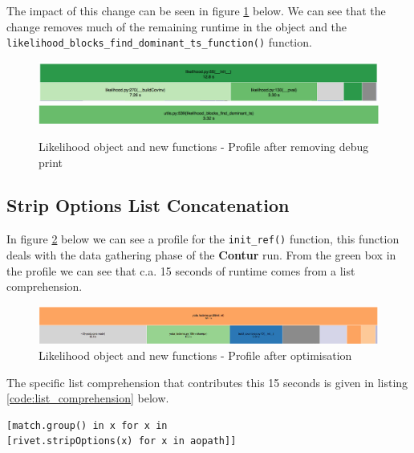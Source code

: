 The impact of this change can be seen in figure \ref{fig:like_last_profile_after_debugger} below. We can see that the change removes much of the remaining runtime in the  object and the \texttt{likelihood\_blocks\_find\_dominant\_ts\_function()} function.

\begin{figure}[H]
\centering
\includegraphics[scale=0.3]{plots/like_after_change.png}
\includegraphics[scale=0.3]{plots/like_blocks_find_dominant_ts.png}
\caption{Likelihood object and new functions - Profile after removing debug print}
\label{fig:like_last_profile_after_debugger}
\end{figure}


\subsection{Strip Options List Concatenation}
In figure \ref{fig:comprehension_before} below we can see a profile for the \texttt{init\_ref()} function, this function deals with the data gathering phase of the \textbf{Contur} run. From the green box in the profile we can see that c.a. 15 seconds of runtime comes from a list comprehension.

\begin{figure}[H]
\centering
\includegraphics[scale=0.3]{plots/list_comprehension_before.png}
\caption{Likelihood object and new functions - Profile after optimisation}
\label{fig:comprehension_before}
\end{figure}

The specific list comprehension that contributes this 15 seconds is given in listing \ref{code:list_comprehension} below.

\begin{code}
\label{code:list_comprehension}
\begin{verbatim}
[match.group() in x for x in 
[rivet.stripOptions(x) for x in aopath]]
\end{verbatim}
\end{code}

